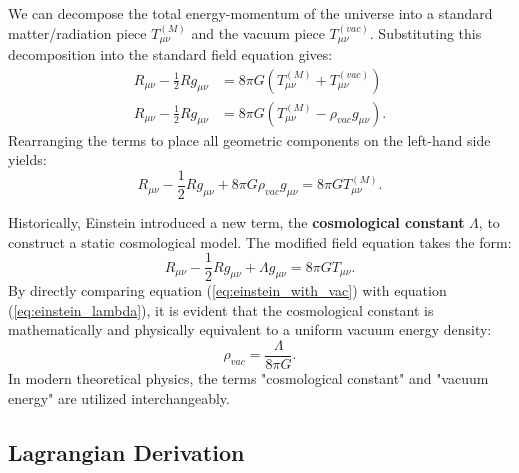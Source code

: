 \documentclass[11pt, a4paper]{report}
\begin{document}
We can decompose the total energy-momentum of the universe into a standard matter/radiation piece $T_{\mu\nu}^{(M)}$ and the vacuum piece $T_{\mu\nu}^{(vac)}$. Substituting this decomposition into the standard field equation gives:
\begin{align}
R_{\mu\nu} - \frac{1}{2}R g_{\mu\nu} &= 8\pi G \left( T_{\mu\nu}^{(M)} + T_{\mu\nu}^{(vac)} \right) \nonumber \\
R_{\mu\nu} - \frac{1}{2}R g_{\mu\nu} &= 8\pi G \left( T_{\mu\nu}^{(M)} - \rho_{vac} g_{\mu\nu} \right).
\end{align}
Rearranging the terms to place all geometric components on the left-hand side yields:
\begin{equation}
\label{eq:einstein_with_vac}
R_{\mu\nu} - \frac{1}{2}R g_{\mu\nu} + 8\pi G \rho_{vac} g_{\mu\nu} = 8\pi G T_{\mu\nu}^{(M)}.
\end{equation}

Historically, Einstein introduced a new term, the \textbf{cosmological constant} $\Lambda$, to construct a static cosmological model. The modified field equation takes the form:
\begin{equation}
\label{eq:einstein_lambda}
R_{\mu\nu} - \frac{1}{2}R g_{\mu\nu} + \Lambda g_{\mu\nu} = 8\pi G T_{\mu\nu}.
\end{equation}
By directly comparing equation (\ref{eq:einstein_with_vac}) with equation (\ref{eq:einstein_lambda}), it is evident that the cosmological constant is mathematically and physically equivalent to a uniform vacuum energy density:
\begin{equation}
\rho_{vac} = \frac{\Lambda}{8\pi G}.
\end{equation}
In modern theoretical physics, the terms "cosmological constant" and "vacuum energy" are utilized interchangeably.

\subsection{Lagrangian Derivation}
\end{document}
